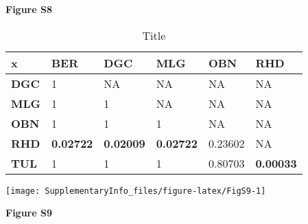 \documentclass[12pt,]{article}
\begin{document}
\textbf{Figure S8}

\pagebreak

\newpage
\begingroup\fontsize{10}{12}\selectfont

\begin{longtable}{>{\bfseries}llllll}
\caption{\label{tab:Table S5}Title}\\
\toprule
\textbf{x} & \textbf{BER} & \textbf{DGC} & \textbf{MLG} & \textbf{OBN} & \textbf{RHD}\\
\midrule
DGC & 1 & NA & NA & NA & NA\\
MLG & 1 & 1 & NA & NA & NA\\
OBN & 1 & 1 & 1 & NA & NA\\
RHD & \textbf{0.02722} & \textbf{0.02009} & \textbf{0.02722} & 0.23602 & NA\\
TUL & 1 & 1 & 1 & 0.80703 & \textbf{0.00033}\\
\bottomrule
\end{longtable}
\endgroup{}

\pagebreak

\newpage

\begin{center}\texttt{[image: SupplementaryInfo\_files/figure-latex/FigS9-1]} \end{center}

\textbf{Figure S9}

\pagebreak

\pagebreak

\begingroup\fontsize{10}{12}\selectfont
\end{document}

